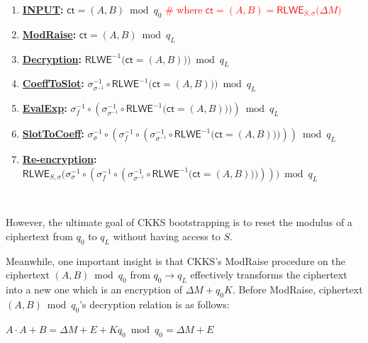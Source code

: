 \begin{enumerate}
\item \textsf{\textbf{\underline{INPUT}:}} $\textsf{ct} = (A, B) \bmod q_0$ \textcolor{red}{ \# where $\textsf{ct}=(A, B) = \textsf{RLWE}_{S, \sigma}\bm(\Delta M \bm)$}

\item \textsf{\textbf{\underline{ModRaise}:}} $\textsf{ct} = (A, B) \bmod q_L$

\item \textsf{\textbf{\underline{Decryption}:}} 
$\textsf{RLWE}^{-1}\textbf{(}\textsf{ct} = (A, B)\textbf{)} \textbf{)} \bmod q_L$

\item \textsf{\textbf{\underline{CoeffToSlot}:}} $\sigma^{-1}_{\sigma^{-1}} \circ \textsf{RLWE}^{-1}\textbf{(}\textsf{ct} = (A, B)\textbf{)} \textbf{)} \bmod q_L$

\item \textsf{\textbf{\underline{EvalExp}:}} $\sigma^{-1}_f \circ (\sigma^{-1}_{\sigma^{-1}} \circ \textsf{RLWE}^{-1}\textbf{(}\textsf{ct} = (A, B)\textbf{)} \textbf{)}) \bmod q_L$

\item \textsf{\textbf{\underline{SlotToCoeff}:}} $\sigma^{-1}_{\sigma} \circ (\sigma^{-1}_f \circ (\sigma^{-1}_{\sigma^{-1}} \circ \textsf{RLWE}^{-1}\textbf{(}\textsf{ct} = (A, B)\textbf{)} \textbf{)})) \bmod q_L$

\item \textsf{\textbf{\underline{Re-encryption}:}} $\textsf{RLWE}_{S, \sigma}\bm(\sigma^{-1}_{\sigma} \circ (\sigma^{-1}_f \circ (\sigma^{-1}_{\sigma^{-1}} \circ \textsf{RLWE}^{-1}\textbf{(}\textsf{ct} = (A, B)\textbf{)} \textbf{)}))\bm) \bmod q_L$

\end{enumerate}

$ $

However, the ultimate goal of CKKS bootstrapping is to reset the modulus of a ciphertext from $q_0$ to $q_L$ without having access to $S$.

Meanwhile, one important insight is that CKKS's \textsf{ModRaise} procedure on the ciphertext $(A, B) \bmod q_0$ from $q_0 \rightarrow q_L$ effectively transforms the ciphertext into a new one which is an encryption of $\Delta M + q_0K$. Before \textsf{ModRaise}, ciphertext $(A, B) \bmod q_0$'s decryption relation is as follows:

$A\cdot A + B = \Delta M + E + Kq_0 \bmod q_0 = \Delta M + E$ 

